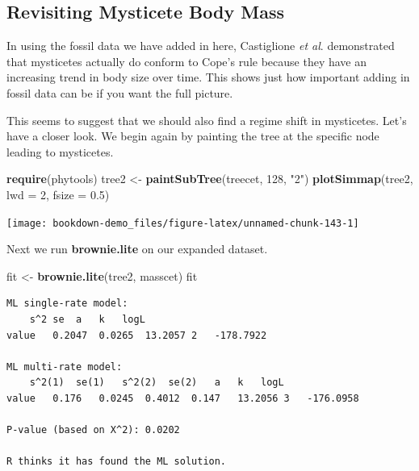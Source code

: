 \documentclass[
]{book}
\newenvironment{Shaded}{\begin{snugshade}}{\end{snugshade}}
\newcommand{\DataTypeTok}[1]{\textcolor[rgb]{0.13,0.29,0.53}{#1}}
\newcommand{\DecValTok}[1]{\textcolor[rgb]{0.00,0.00,0.81}{#1}}
\newcommand{\FloatTok}[1]{\textcolor[rgb]{0.00,0.00,0.81}{#1}}
\newcommand{\KeywordTok}[1]{\textcolor[rgb]{0.13,0.29,0.53}{\textbf{#1}}}
\newcommand{\NormalTok}[1]{#1}
\newcommand{\StringTok}[1]{\textcolor[rgb]{0.31,0.60,0.02}{#1}}
\begin{document}
\hypertarget{revisiting-mysticete-body-mass}{%
\subsection{Revisiting Mysticete Body Mass}\label{revisiting-mysticete-body-mass}}

In using the fossil data we have added in here, Castiglione \emph{et al}. \citeyearpar{Castiglione20} demonstrated that mysticetes actually do conform to Cope's rule because they have an increasing trend in body size over time. This shows just how important adding in fossil data can be if you want the full picture.

This seems to suggest that we should also find a regime shift in mysticetes. Let's have a closer look. We begin again by painting the tree at the specific node leading to mysticetes.

\begin{Shaded}
\begin{Highlighting}[]
\KeywordTok{require}\NormalTok{(phytools)}
\NormalTok{tree2 \textless{}{-}}\StringTok{ }\KeywordTok{paintSubTree}\NormalTok{(treecet, }\DecValTok{128}\NormalTok{, }\StringTok{"2"}\NormalTok{)}
\KeywordTok{plotSimmap}\NormalTok{(tree2, }\DataTypeTok{lwd =} \DecValTok{2}\NormalTok{, }\DataTypeTok{fsize =} \FloatTok{0.5}\NormalTok{)}
\end{Highlighting}
\end{Shaded}

\begin{center}\texttt{[image: bookdown-demo\_files/figure-latex/unnamed-chunk-143-1]} \end{center}

Next we run \textbf{brownie.lite} on our expanded dataset.

\begin{Shaded}
\begin{Highlighting}[]
\NormalTok{fit \textless{}{-}}\StringTok{ }\KeywordTok{brownie.lite}\NormalTok{(tree2, masscet)}
\NormalTok{fit}
\end{Highlighting}
\end{Shaded}

\begin{verbatim}
ML single-rate model:
    s^2 se  a   k   logL
value   0.2047  0.0265  13.2057 2   -178.7922   

ML multi-rate model:
    s^2(1)  se(1)   s^2(2)  se(2)   a   k   logL    
value   0.176   0.0245  0.4012  0.147   13.2056 3   -176.0958

P-value (based on X^2): 0.0202 

R thinks it has found the ML solution.
\end{verbatim}
\end{document}
